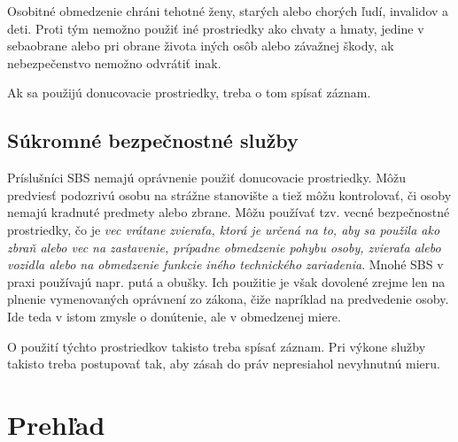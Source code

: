 \documentclass[openany]{book}
\begin{document}
Osobitné obmedzenie chráni tehotné ženy, starých alebo chorých ľudí, invalidov a deti. Proti tým nemožno použiť iné prostriedky ako chvaty a hmaty, jedine v sebaobrane alebo pri obrane života iných osôb alebo závažnej škody, ak nebezpečenstvo nemožno odvrátiť inak.

Ak sa použijú donucovacie prostriedky, treba o tom spísať záznam. 
 
\subsection{Súkromné bezpečnostné služby}
Príslušníci SBS nemajú oprávnenie použiť donucovacie prostriedky. Môžu predviesť podozrivú osobu na strážne stanovište a tiež môžu kontrolovať, či osoby nemajú kradnuté predmety alebo zbrane. Môžu používať tzv. vecné bezpečnostné prostriedky, čo je \emph{vec vrátane zvieraťa, ktorá je určená na to, aby sa použila ako zbraň alebo vec na zastavenie, prípadne obmedzenie pohybu osoby, zvieraťa alebo vozidla alebo na obmedzenie funkcie iného technického zariadenia}. Mnohé SBS v praxi používajú napr. putá a obušky. Ich použitie je však dovolené zrejme len na plnenie vymenovaných oprávnení zo zákona, čiže napríklad na predvedenie osoby. Ide teda v istom zmysle o donútenie, ale v obmedzenej miere.

O použití týchto prostriedkov takisto treba spísať záznam. Pri výkone služby takisto treba postupovať tak, aby zásah do práv nepresiahol nevyhnutnú mieru. 


\section{Prehľad}
\end{document}
